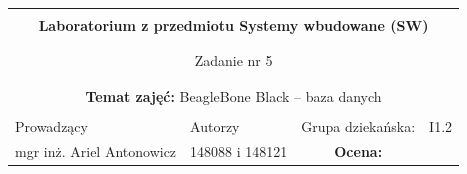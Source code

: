 \documentclass[polish,a4paper]{article}
\begin{document}
	\begin{center}
		\begin{tabular}{ p{} p{} p{} p{} p{} }

			&   &   &   &  \\
			\hline
			\multicolumn{5}{|c|}{}\\[-1ex]
			\multicolumn{5}{|c|}{{\LARGE \textbf{Laboratorium z przedmiotu Systemy wbudowane (SW)}}}\\
			\multicolumn{5}{|c|}{}\\[-1ex]
			\hline
			\hline

			\multicolumn{5}{|c|}{}\\[-1ex]
			\multicolumn{5}{|c|}{{\LARGE Zadanie nr 5}}\\
			\multicolumn{5}{|c|}{}\\[-1ex]
			\hline
			\hline

			\multicolumn{5}{|c|}{}\\[-1ex]
			\multicolumn{5}{|c|}{{\textbf{Temat zajęć:} BeagleBone Black – baza danych}}\\
			\multicolumn{5}{|c|}{}\\[-1ex]
			\hline
			\hline

			\multicolumn{1}{|l|}{Prowadzący} &
			\multicolumn{2}{|l|}{Autorzy} &
			\multicolumn{1}{|l|}{Grupa dziekańska:}
			&
			\multicolumn{1}{|l|}{I1.2} \\
			\multicolumn{1}{|c|}{mgr inż. Ariel Antonowicz} &
			\multicolumn{2}{|c|}{148088 i 148121} &
			\multicolumn{1}{|c|}{\textbf{Ocena:}} &
			\multicolumn{1}{|c|}{}\\
			\hline
			\hline
		\end{tabular}
	\end{center}
    \[\,\]
\end{document}
